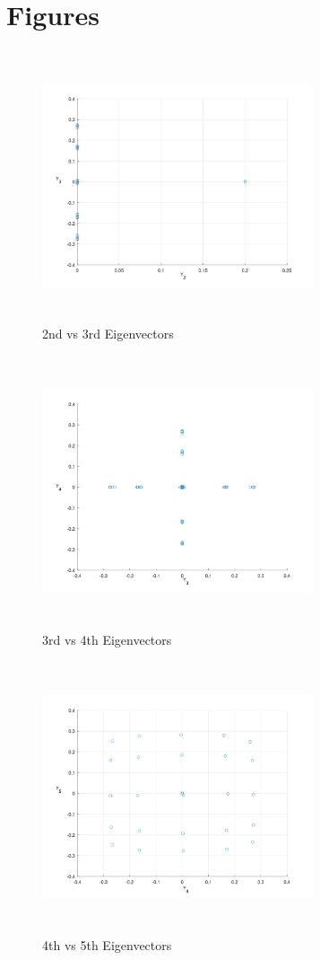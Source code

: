 \documentclass[11pt]{article}
\begin{document}
\section{Figures}
\label{sec:org16e8489}

\begin{figure}[htbp]
\centering
\includegraphics[width=8cm,height=8cm]{./resources/y2y3.png}
\caption{\label{fig:org71ea535}2nd vs 3rd Eigenvectors}
\end{figure}

\begin{figure}[htbp]
\centering
\includegraphics[width=8cm,height=8cm]{./resources/y3y4.png}
\caption{\label{fig:orgeeed81a}3rd vs 4th Eigenvectors}
\end{figure}


\begin{figure}[htbp]
\centering
\includegraphics[width=8cm,height=8cm]{./resources/y4y5.png}
\caption{\label{fig:org499b444}4th vs 5th Eigenvectors}
\end{figure}
\end{document}
